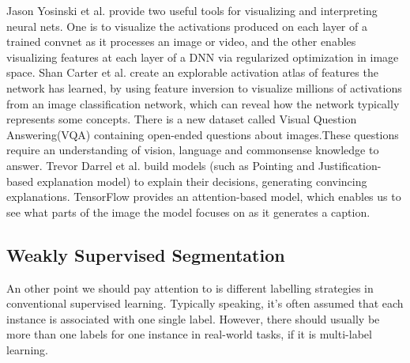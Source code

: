 \documentclass[10pt,twocolumn,letterpaper]{article}
\begin{document}
Jason Yosinski et al. provide two useful tools for visualizing and interpreting neural nets. 
One is to visualize  the activations produced on each layer of a trained convnet as it 
processes an image or video, and the other enables visualizing 
features at each layer of a DNN via regularized optimization in image space.
Shan Carter et al. create an explorable activation atlas of features the network has learned, by using feature inversion to visualize millions of activations from an image classification network, which can reveal how the network typically represents some concepts.
There is a new dataset called Visual Question Answering(VQA) containing open-ended questions about images.These questions require an understanding of vision, language and commonsense knowledge to answer.
Trevor Darrel et al. build  models (such as Pointing and Justification-based explanation model) to explain their decisions, generating convincing explanations.
TensorFlow provides an attention-based model, which enables us to see what parts of the image the model focuses on as it generates a caption.

\subsection{Weakly Supervised Segmentation}

An other point we should pay attention to is different labelling strategies in conventional supervised learning.
Typically speaking, it's often assumed that each instance is associated with one single label. However, there should usually be more than one labels for one instance in real-world tasks, if it is multi-label learning.
\end{document}
